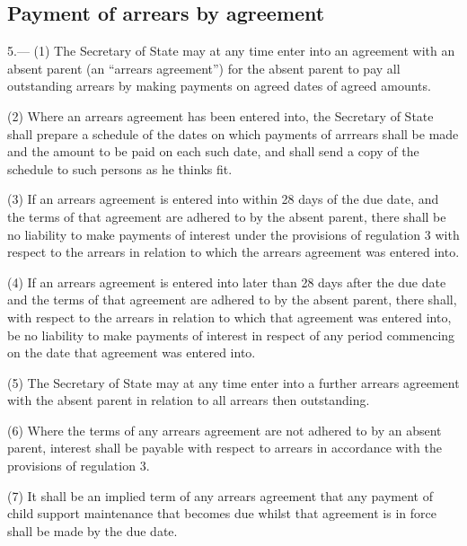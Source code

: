 \documentclass[12pt,a4paper]{article}
\begin{document}
\subsection[5. Payment of arrears by agreement]{Payment of arrears by agreement}

5.—%
%
(1) The Secretary of State may at any time enter into an agreement with an absent parent (an “arrears agreement”) for the absent parent to pay all outstanding arrears by making payments on agreed dates of agreed amounts.

(2) Where an arrears agreement has been entered into, the Secretary of State shall prepare a schedule of the dates on which payments of arrrears shall be made and the amount to be paid on each such date, and shall send a copy of the schedule to such persons as he thinks fit.

(3) If an arrears agreement is entered into within 28 days of the due date, and the terms of that agreement are adhered to by the absent parent, there shall be no liability to make payments of interest under the provisions of regulation 3 with respect to the arrears in relation to which the arrears agreement was entered into.

(4) If an arrears agreement is entered into later than 28 days after the due date and the terms of that agreement are adhered to by the absent parent, there shall, with respect to the arrears in relation to which that agreement was entered into, be no liability to make payments of interest in respect of any period commencing on the date that agreement was entered into.

(5) The Secretary of State may at any time enter into a further arrears agreement with the absent parent in relation to all arrears then outstanding.

(6) Where the terms of any arrears agreement are not adhered to by an absent parent, interest shall be payable with respect to arrears in accordance with the provisions of regulation 3.

(7) It shall be an implied term of any arrears agreement that any payment of child support maintenance that becomes due whilst that agreement is in force shall be made by the due date.
\end{document}
